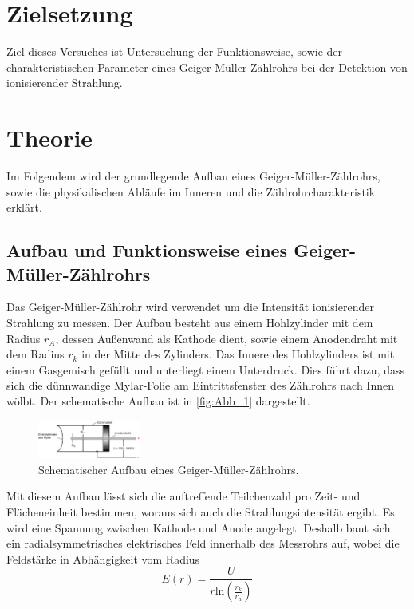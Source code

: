 \section{Zielsetzung}
\label{sec:Zielsetzung}
Ziel dieses Versuches ist Untersuchung der Funktionsweise, sowie der charakteristischen
Parameter eines Geiger-Müller-Zählrohrs bei der Detektion von ionisierender Strahlung.

\section{Theorie}
\label{sec:Theorie}
Im Folgendem wird der grundlegende Aufbau eines Geiger-Müller-Zählrohrs, 
sowie die physikalischen Abläufe im Inneren und die Zählrohrcharakteristik erklärt.

\subsection{Aufbau und Funktionsweise eines Geiger-Müller-Zählrohrs}
\label{subsec:AufuFunk}
Das Geiger-Müller-Zählrohr wird verwendet um die Intensität ionisierender Strahlung
zu messen. Der Aufbau besteht aus einem Hohlzylinder mit dem Radius $r_A$, dessen Außenwand  als Kathode
dient, sowie einem Anodendraht mit dem Radius $r_k$ in der Mitte des Zylinders. Das Innere des Hohlzylinders
ist mit einem Gasgemisch gefüllt und unterliegt einem Unterdruck. Dies führt dazu, dass sich die dünnwandige
Mylar-Folie am Eintrittsfenster des Zählrohrs nach Innen wölbt. Der schematische Aufbau ist in \autoref{fig:Abb_1}
dargestellt.
\begin{figure}[H]
    \centering
    \includegraphics[width=0.3\textwidth]{Abbildungen/Abb_1.png}
    \caption{Schematischer Aufbau eines Geiger-Müller-Zählrohrs.\cite{V703}}
    \label{fig:Abb_1}
\end{figure}
Mit diesem Aufbau lässt sich die auftreffende Teilchenzahl pro Zeit- und Flächeneinheit bestimmen,
woraus sich auch die Strahlungsintensität ergibt. Es wird eine Spannung zwischen 
Kathode und Anode angelegt. Deshalb baut sich ein radialsymmetrisches elektrisches Feld
innerhalb des Messrohrs auf, wobei die Feldstärke in Abhängigkeit vom Radius
\begin{equation*}
    E(r) = \frac{U}{r\text{ln}(\frac{r_k}{r_a})}
\end{equation*}

